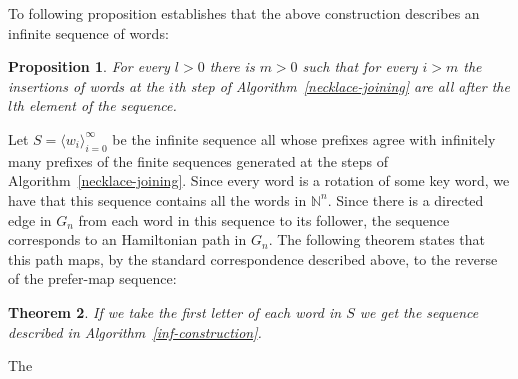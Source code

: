 \documentclass{article}
\newtheorem{theorem}{Theorem}
\newtheorem{proposition}[theorem]{Proposition}
\theoremstyle{definition}
\newcommand{\N}{{\mathbb{N}}}
\newcommand{\T}[1]{\langle{#1}\rangle}
\begin{document}
To following proposition establishes that the above construction describes an infinite sequence of words:

\begin{proposition}
	For every $l>0$ there is $m>0$ such that for every $i>m$ the insertions of words at the $i$th step of Algorithm~\ref{necklace-joining} are all after the $l$th element of the sequence.
\end{proposition}

Let $S=\T{w_i}_{i=0}^\infty$ be the infinite sequence all whose prefixes agree with infinitely many prefixes of the finite sequences generated at the steps of Algorithm~\ref{necklace-joining}. Since every word is a rotation of some key word, we have that this sequence contains all the words in $\N^n$. Since there is a directed edge in $G_n$ from each word in this sequence to its follower, the sequence corresponds to an Hamiltonian path in $G_n$. The following theorem states that this path maps, by the standard correspondence described above, to the reverse of the prefer-map sequence:

\begin{theorem}
	If we take the first letter of each word in $S$ we get the sequence described in Algorithm~\ref{inf-construction}.
\end{theorem}

The 





	
\end{document}
